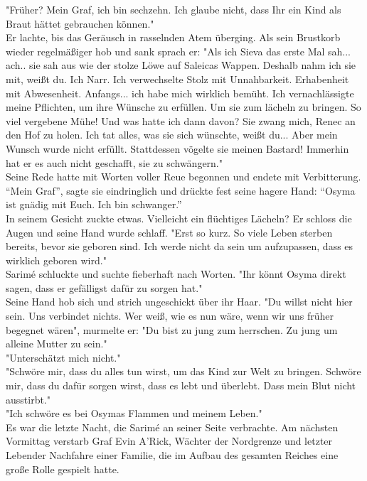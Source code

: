 "Früher? Mein Graf, ich bin sechzehn. Ich glaube nicht, dass Ihr ein Kind als Braut hättet 
gebrauchen können."\\
Er lachte, bis das Geräusch in rasselnden Atem überging. Als sein Brustkorb wieder regelmäßiger hob 
und sank sprach er: "Als ich Sieva das erste Mal sah... ach.. sie sah aus wie der stolze Löwe auf 
Saleicas Wappen. Deshalb nahm ich sie mit, weißt du. Ich Narr. Ich verwechselte Stolz mit 
Unnahbarkeit. Erhabenheit mit Abwesenheit. Anfangs... ich habe mich wirklich bemüht. Ich 
vernachlässigte meine Pflichten, um ihre Wünsche zu erfüllen. Um sie zum lächeln zu bringen. So 
viel vergebene Mühe! Und was hatte ich dann davon? Sie zwang mich, Renec an den Hof zu holen. Ich 
tat alles, was sie sich wünschte, weißt du... Aber mein Wunsch wurde nicht erfüllt. Stattdessen 
vögelte sie meinen Bastard! Immerhin hat er es auch nicht geschafft, sie zu schwängern."\\
Seine Rede hatte mit Worten voller Reue begonnen und endete mit Verbitterung.\\
``Mein Graf'', sagte sie eindringlich und drückte fest seine hagere Hand: ``Osyma ist gnädig mit 
Euch. 
Ich bin schwanger.''\\
In seinem Gesicht zuckte etwas. Vielleicht ein flüchtiges Lächeln? Er schloss die Augen und seine 
Hand wurde schlaff. "Erst so kurz. So viele Leben sterben bereits, bevor sie geboren sind. Ich 
werde nicht da sein um aufzupassen, dass es wirklich geboren wird."\\
Sarimé schluckte und suchte fieberhaft nach Worten. "Ihr könnt Osyma direkt sagen, dass er 
gefälligst dafür zu sorgen hat."\\
Seine Hand hob sich und strich ungeschickt über ihr Haar. "Du willst nicht hier sein. Uns verbindet 
nichts. Wer weiß, wie es nun wäre, wenn wir uns früher begegnet wären", murmelte er: "Du bist zu 
jung zum herrschen. Zu jung um alleine Mutter zu sein."\\
"Unterschätzt mich nicht."\\
"Schwöre mir, dass du alles tun wirst, um das Kind zur Welt zu bringen. Schwöre mir, dass du dafür 
sorgen wirst, dass es lebt und überlebt. Dass mein Blut nicht ausstirbt."\\
"Ich schwöre es bei Osymas Flammen und meinem Leben."\\
Es war die letzte Nacht, die Sarimé an seiner Seite verbrachte. Am nächsten Vormittag verstarb Graf 
Evin A’Rick, Wächter der Nordgrenze und letzter Lebender Nachfahre einer Familie, die im Aufbau des 
gesamten Reiches eine große Rolle gespielt hatte.\\


